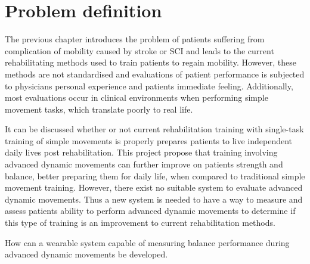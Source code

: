 \section{Problem definition}

The previous chapter introduces the problem of patients suffering from complication of mobility caused by stroke or SCI and leads to the current rehabilitating methods used to train patients to regain mobility. 
However, these methods are not standardised and evaluations of patient performance is subjected to physicians personal experience and patients immediate feeling. Additionally, most evaluations occur in clinical environments when performing simple movement tasks, which translate poorly to real life. 

It can be discussed whether or not current rehabilitation training with single-task training of simple movements is properly prepares patients to live independent daily lives post rehabilitation. This project propose that training involving advanced dynamic movements can further improve on patients strength and balance, better preparing them for daily life, when compared to traditional simple movement training. 
However, there exist no suitable system to evaluate advanced dynamic movements. Thus a new system is needed to have a way to measure and assess patients ability to perform advanced dynamic movements to determine if this type of training is an improvement to current rehabilitation methods.


\begin{center}
How can a wearable system capable of measuring balance performance during advanced dynamic movements be developed.
\end{center}
